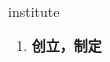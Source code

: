 
\begin{frame}
{\huge institute}
\begin{center}
\begin{enumerate}\Large
  \item \textbf{创立，制定}
\end{enumerate}
\end{center}
\end{frame}
